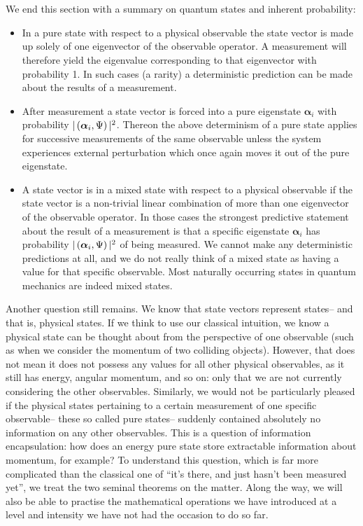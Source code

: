 \\\\
We end this section with a summary on quantum states and inherent probability:
\begin{itemize}
    \item In a pure state with respect to a physical observable the state vector is made up solely of one eigenvector of the observable operator. A measurement will therefore yield the eigenvalue corresponding to that eigenvector with probability 1. In such cases (a rarity) a deterministic prediction can be made about the results of a measurement.
    \item After measurement a state vector is forced into a pure eigenstate $\bm{\alpha}_{i}$ with probability $|\left(\bm{\alpha}_{i},\Psi\right)|^2$. Thereon the above determinism of a pure state applies for successive measurements of the same observable unless the system experiences external perturbation which once again moves it out of the pure eigenstate.
    \item A state vector is in a mixed state with respect to a physical observable if the state vector is a non-trivial linear combination of more than one eigenvector of the observable operator. In those cases the strongest predictive statement about the result of a measurement is that a specific eigenstate $\bm{\alpha}_{i}$ has probability $|\left(\bm{\alpha}_{i},\Psi\right)|^2$ of being measured. We cannot make any deterministic predictions at all, and we do not really think of a mixed state as having a value for that specific observable. Most naturally occurring states in quantum mechanics are indeed mixed states.
\end{itemize}
Another question still remains. We know that state vectors represent states-- and that is, physical states. If we think to use our classical intuition, we know a physical state can be thought about from the perspective of one observable (such as when we consider the momentum of two colliding objects). However, that does not mean it does not possess any values for all other physical observables, as it still has energy, angular momentum, and so on: only that we are not currently considering the other observables. Similarly, we would not be particularly pleased if the physical states pertaining to a certain measurement of one specific observable-- these so called pure states-- suddenly contained absolutely no information on any other observables. This is a question of information encapsulation: how does an energy pure state store extractable information about momentum, for example? To understand this question, which is far more complicated than the classical one of ``it's there, and just hasn't been measured yet'', we treat the two seminal theorems on the matter. Along the way, we will also be able to practise the mathematical operations we have introduced at a level and intensity we have not had the occasion to do so far.
